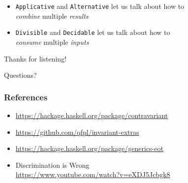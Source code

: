 \documentclass[UKenglish,usenames,dvipsnames,svgnames,table,aspectratio=169,mathserif]{beamer}
\newcommand{\nl}{\vspace{\baselineskip}}
\newcommand{\pnl}{\pause \nl}
\begin{document}
\begin{frame}

\Large
\begin{itemize}
\item {\tt Applicative} and {\tt Alternative} let us talk about how to \\
      {\it combine} multiple {\it results}
\item {\tt Divisible} and {\tt Decidable} let us talk about how to \\
      {\it consume} multiple {\it inputs}
\end{itemize}

\end{frame}





%






\begin{frame}
\centering
\Huge
Thanks for listening!

\nl

Questions?
\end{frame}


\begin{frame}
\frametitle{References}

\begin{itemize}
\item \url{https://hackage.haskell.org/package/contravariant}
\item \url{https://github.com/qfpl/invariant-extras}
\item \url{https://hackage.haskell.org/package/generics-eot}
\item Discrimination is Wrong \\
      \url{https://www.youtube.com/watch?v=eXDJ5Jcbgk8}
\end{itemize}

\end{frame}
\end{document}
